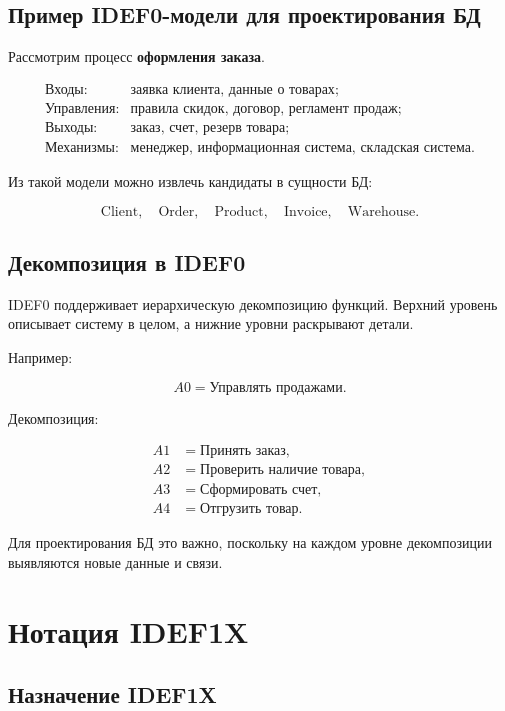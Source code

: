 \documentclass[12pt,a4paper]{article}
\theoremstyle{remark}
\begin{document}
\subsection{Пример IDEF0-модели для проектирования БД}

Рассмотрим процесс \textbf{оформления заказа}.

\[
\begin{array}{lll}
    \text{Входы:} & \text{заявка клиента, данные о товарах};\\
    \text{Управления:} & \text{правила скидок, договор, регламент продаж};\\
    \text{Выходы:} & \text{заказ, счет, резерв товара};\\
    \text{Механизмы:} & \text{менеджер, информационная система, складская система}.
\end{array}
\]

Из такой модели можно извлечь кандидаты в сущности БД:

\[
    \text{Client}, \quad \text{Order}, \quad \text{Product}, \quad \text{Invoice}, \quad \text{Warehouse}.
\]

\subsection{Декомпозиция в IDEF0}

IDEF0 поддерживает иерархическую декомпозицию функций. Верхний уровень описывает систему в целом, а нижние уровни раскрывают детали.

Например:

\[
    A0 = \text{Управлять продажами}.
\]

Декомпозиция:

\[
\begin{aligned}
    A1 &= \text{Принять заказ},\\
    A2 &= \text{Проверить наличие товара},\\
    A3 &= \text{Сформировать счет},\\
    A4 &= \text{Отгрузить товар}.
\end{aligned}
\]

Для проектирования БД это важно, поскольку на каждом уровне декомпозиции выявляются новые данные и связи.

\section{Нотация IDEF1X}

\subsection{Назначение IDEF1X}
\end{document}
